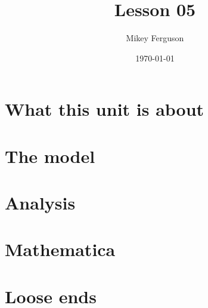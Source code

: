 \documentclass[11pt]{article}
\title{Lesson 05}
\author{Mikey Ferguson}
\date{\today}
\begin{document}
\maketitle
\tableofcontents
\bigskip

\section{What this unit is about}

\section{The model}

\section{Analysis}

\section{Mathematica}

\section{Loose ends}
\end{document}
